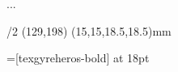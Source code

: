 \fontfam[Termes] 

\def\twelvesl{\it}  %
\def\twelveit{\it}  %
\def\twelvebf{\bf}  %
\def\twelverm{\rm}  %

\def\twelvess{\fontfam[Heros]} 
\def\seventeenss{\typosize[17/21]\fontfam[Heros]}

\def\twelvett{\fontfam[Cursor]} 

...
\def\tentt{\fontfam[Cursor]} 

\raggedbottom

\chardef{}

\typosize[10/12]

\enlang {}

\margins/2 (129,198) (15,15,18.5,18.5)mm

\parskip=0pt
\parindent=12pt
\emergencystretch=5pt

\fontfam[EBGaramond] 

\font\Albertus=[texgyreheros-bold] at 18pt

\def\twelvesl{\it}  
\def\twelveit{\it}  
\def\twelvebf{\bf}  
\def\twelverm{\rm}  
\def\twelvess{\fontfam[Heros]} 
\def\seventeenss{\typosize[17/21]\fontfam[Heros]}
\def\twelvett{\fontfam[Cursor]} 
\def\tentt{\fontfam[Cursor]} 
\chardef{} 
\raggedbottom


\def\frontmattergap{\vskip 10mm}
\def\titlegap{\vskip 25mm}
\def\publishergap{\vfill}
\def\copyrightgap{\vskip 4mm}

